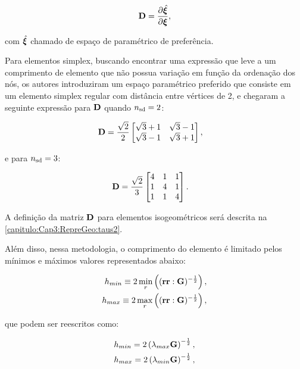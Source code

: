 \begin{align}
	\mathbf{D} = \frac{\partial{\hat{\bm{\xi}}}}{\partial{\bm{\xi}}},
\end{align}

\noindent com $\hat{\bm{\xi}}$ chamado de espaço de paramétrico de preferência.

Para elementos simplex, buscando encontrar uma expressão que leve a um comprimento de elemento que não possua variação em função da ordenação dos nós, os autores introduziram um espaço paramétrico preferido que consiste em um elemento simplex regular com distância entre vértices de 2, e chegaram a seguinte expressão para $\mathbf{D}$ quando ${n_{\mathrm{sd}}} = 2$:

\begin{align}
	\mathbf{D}&= \frac{\sqrt{2}}{2} \begin{bmatrix}
		\sqrt{3} + 1 & \sqrt{3} - 1 \\
		\sqrt{3} - 1 & \sqrt{3} + 1
	\end{bmatrix},
\end{align}

\noindent e para ${n_{\mathrm{sd}}} = 3$:

\begin{align}
	\mathbf{D}&= \frac{\sqrt{2}}{3} \begin{bmatrix}
		4 & 1 & 1 \\
		1 & 4 & 1 \\
		1 & 1 & 4
	\end{bmatrix}.
\end{align}

A definição da matriz $\mathbf{D}$ para elementos isogeométricos será descrita na \autoref{capitulo:Cap3:RepreGeo:taus2}.

Além disso, nessa metodologia, o comprimento do elemento é limitado pelos mínimos e máximos valores representados abaixo:

\begin{align}
	h_{min} \equiv 2\min_{r}\left((\mathbf{r}\mathbf{r}:\mathbf{G})^{-\frac{1}{2}} \right), \\
	h_{max} \equiv 2\max_{r}\left((\mathbf{r}\mathbf{r}:\mathbf{G})^{-\frac{1}{2}} \right),
\end{align}

\noindent que podem ser reescritos como:

\begin{align}
	h_{min} = 2\left(\lambda_{max}\mathbf{G}\right)^{-\frac{1}{2}}, \\
	h_{max} = 2\left(\lambda_{min}\mathbf{G}\right)^{-\frac{1}{2}},
\end{align}

